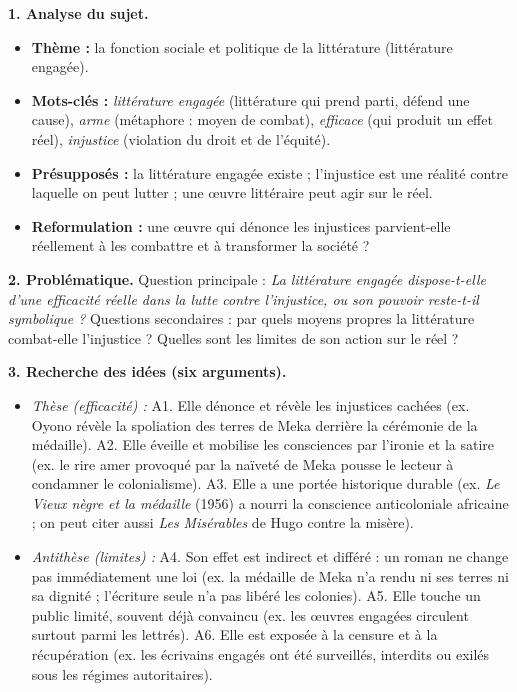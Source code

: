\documentclass[11pt]{article}
\begin{document}
\begin{corrige}
\textbf{1. Analyse du sujet.}
\begin{itemize}
\item \textbf{Thème :} la fonction sociale et politique de la littérature (littérature engagée).
\item \textbf{Mots-clés :} \emph{littérature engagée} (littérature qui prend parti, défend une cause), \emph{arme} (métaphore : moyen de combat), \emph{efficace} (qui produit un effet réel), \emph{injustice} (violation du droit et de l'équité).
\item \textbf{Présupposés :} la littérature engagée existe ; l'injustice est une réalité contre laquelle on peut lutter ; une œuvre littéraire peut agir sur le réel.
\item \textbf{Reformulation :} une œuvre qui dénonce les injustices parvient-elle réellement à les combattre et à transformer la société ?
\end{itemize}

\textbf{2. Problématique.} Question principale : \emph{La littérature engagée dispose-t-elle d'une efficacité réelle dans la lutte contre l'injustice, ou son pouvoir reste-t-il symbolique ?} Questions secondaires : par quels moyens propres la littérature combat-elle l'injustice ? Quelles sont les limites de son action sur le réel ?

\textbf{3. Recherche des idées (six arguments).}
\begin{itemize}
\item \emph{Thèse (efficacité) :} A1. Elle dénonce et révèle les injustices cachées (ex. Oyono révèle la spoliation des terres de Meka derrière la cérémonie de la médaille). A2. Elle éveille et mobilise les consciences par l'ironie et la satire (ex. le rire amer provoqué par la naïveté de Meka pousse le lecteur à condamner le colonialisme). A3. Elle a une portée historique durable (ex. \emph{Le Vieux nègre et la médaille} (1956) a nourri la conscience anticoloniale africaine ; on peut citer aussi \emph{Les Misérables} de Hugo contre la misère).
\item \emph{Antithèse (limites) :} A4. Son effet est indirect et différé : un roman ne change pas immédiatement une loi (ex. la médaille de Meka n'a rendu ni ses terres ni sa dignité ; l'écriture seule n'a pas libéré les colonies). A5. Elle touche un public limité, souvent déjà convaincu (ex. les œuvres engagées circulent surtout parmi les lettrés). A6. Elle est exposée à la censure et à la récupération (ex. les écrivains engagés ont été surveillés, interdits ou exilés sous les régimes autoritaires).
\end{itemize}


\end{corrige}
\end{document}
